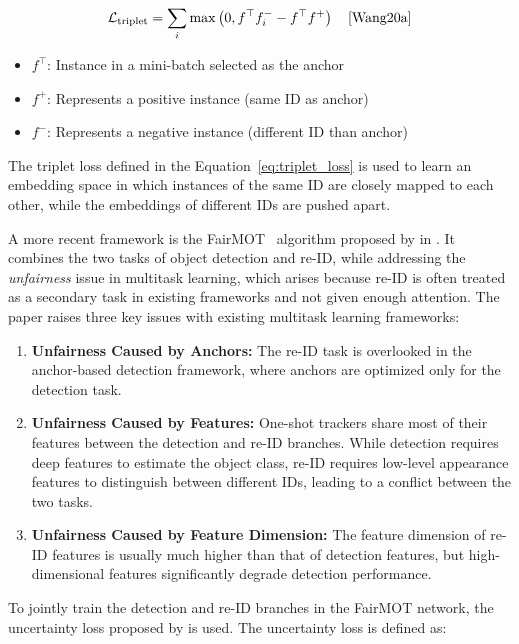 \begin{equation}
    \label{eq:triplet_loss}
    \mathcal{L}_{\text{triplet}}=\sum_i \max \left(0, f^{\top} f_i^{-}-f^{\top} f^{+}\right)
    \quad\text{\cite[Eq.~1]{Wang20a}}
\end{equation}

\begin{itemize}
    \item \(f^{\top}\): Instance in a mini-batch selected as the anchor
    \item \(f^{+}\): Represents a positive instance (same ID as anchor)
    \item \(f^{-}\): Represents a negative instance (different ID than anchor)
\end{itemize}

The triplet loss defined in the Equation~\ref{eq:triplet_loss} is used to learn an embedding space in which instances of the same ID are closely mapped to each other, while the embeddings of different IDs are pushed apart.

A more recent framework is the FairMOT~\cite{Zhang21} algorithm proposed by \citeauthor{Zhang21} in \citeyear{Zhang21}. It combines the two tasks of object detection and re-ID, while addressing the \textit{unfairness} issue in multitask learning, which arises because re-ID is often treated as a secondary task in existing frameworks and not given enough attention. The paper raises three key issues with existing multitask learning frameworks:

\begin{enumerate}
    \item \textbf{Unfairness Caused by Anchors:} The re-ID task is overlooked in the anchor-based detection framework, where anchors are optimized only for the detection task.
    \item \textbf{Unfairness Caused by Features:} One-shot trackers share most of their features between the detection and re-ID branches. While detection requires deep features to estimate the object class, re-ID requires low-level appearance features to distinguish between different IDs, leading to a conflict between the two tasks.
    \item \textbf{Unfairness Caused by Feature Dimension:} The feature dimension of re-ID features is usually much higher than that of detection features, but high-dimensional features significantly degrade detection performance.
\end{enumerate}

To jointly train the detection and re-ID branches in the FairMOT network, the uncertainty loss proposed by \textcite{Cipolla18} is used. The uncertainty loss is defined as:


